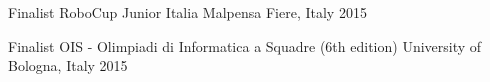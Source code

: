 
\begin{cvhonors}

  \cvhonor
    {Finalist}
    {RoboCup Junior Italia}
    {Malpensa Fiere, Italy}
    {2015}

  \cvhonor
    {Finalist}
    {OIS - Olimpiadi di Informatica a Squadre (6th edition)}
    {University of Bologna, Italy}
    {2015}

\end{cvhonors}
